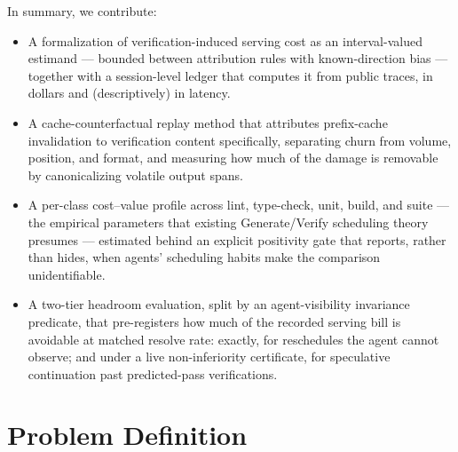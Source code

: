 \documentclass[11pt]{article}
\begin{document}
In summary, we contribute:
\begin{itemize}[leftmargin=1.5em]
  \item A formalization of verification-induced serving cost as an interval-valued estimand --- bounded between attribution rules with known-direction bias --- together with a session-level ledger that computes it from public traces, in dollars and (descriptively) in latency.
  \item A cache-counterfactual replay method that attributes prefix-cache invalidation to verification content specifically, separating churn from volume, position, and format, and measuring how much of the damage is removable by canonicalizing volatile output spans.
  \item A per-class cost--value profile across lint, type-check, unit, build, and suite --- the empirical parameters that existing Generate/Verify scheduling theory presumes --- estimated behind an explicit positivity gate that reports, rather than hides, when agents' scheduling habits make the comparison unidentifiable.
  \item A two-tier headroom evaluation, split by an agent-visibility invariance predicate, that pre-registers how much of the recorded serving bill is avoidable at matched resolve rate: exactly, for reschedules the agent cannot observe; and under a live non-inferiority certificate, for speculative continuation past predicted-pass verifications.
\end{itemize}

\section{Problem Definition}
\end{document}
